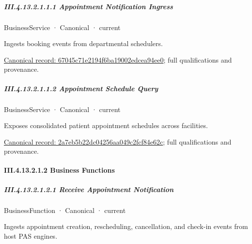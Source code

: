 \subparagraph*{III.4.13.2.1.1.1 Appointment Notification Ingress}
\label{navigation:III.4.13.2.1.1.1}

\label{element:67045c71e2194f6ba19002edcea94ee0}
{\small BusinessService · Canonical · current}\par

Ingests booking events from departmental schedulers.


{\footnotesize \href{../../../../continuum/business/business-service/67045c71e2194f6ba19002edcea94ee0.md}{Canonical record: 67045c71e2194f6ba19002edcea94ee0}; full qualifications and provenance.}\par
\subparagraph*{III.4.13.2.1.1.2 Appointment Schedule Query}
\label{navigation:III.4.13.2.1.1.2}

\label{element:2a7eb5b22dc04256aa049c2fcf84e62c}
{\small BusinessService · Canonical · current}\par

Exposes consolidated patient appointment schedules across facilities.


{\footnotesize \href{../../../../continuum/business/business-service/2a7eb5b22dc04256aa049c2fcf84e62c.md}{Canonical record: 2a7eb5b22dc04256aa049c2fcf84e62c}; full qualifications and provenance.}\par
\paragraph*{III.4.13.2.1.2 Business Functions}
\label{navigation:III.4.13.2.1.2}

\subparagraph*{III.4.13.2.1.2.1 Receive Appointment Notification}
\label{navigation:III.4.13.2.1.2.1}

\label{element:8aa2e7b197ae4a0c99b654b9f1a312e8}
{\small BusinessFunction · Canonical · current}\par

Ingests appointment creation, rescheduling, cancellation, and check-in events from host PAS engines.


